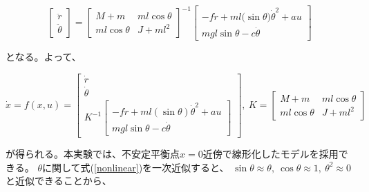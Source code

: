 \documentclass[a4j,11pt,twoside]{jbook}
\begin{document}
$$
    \left[
    \begin{array}{c}
        \ddot{r} \\
        \ddot{\theta}
    \end{array}    
    \right]
    =
    \left[
    \begin{array}{cc}
        M + m           &  ml\cos{\theta} \\
        ml\cos{\theta}  &  J + ml^2
    \end{array}
    \right]^{-1}
    \left[
        \begin{array}{c}
            -f \dot{r} + ml(\sin{\theta)} \dot{\theta}^2 + au \\
            mgl\sin{\theta} - c \dot{\theta}
        \end{array}
    \right]
$$

となる。よって、

\begin{equation}
    \dot x = f(x, u) = 
    \left[
        \begin{array}{c}
            \dot{r} \\
            \dot{\theta} \\
            K^{-1}
            \left[
                \begin{array}{c}
                    -f \dot{r} + ml(\sin{\theta}) \dot{\theta}^2 + au \\
                    mgl\sin{\theta} - c \dot{\theta}
                \end{array}
            \right]
        \end{array}    
    \right],\
    K = 
    \left[
        \begin{array}{cc}
            M + m           &  ml\cos{\theta} \\
            ml\cos{\theta}  &  J + ml^2
        \end{array}
    \right]
    \label{nonlinear}
\end{equation}

が得られる。本実験では、不安定平衡点$x=0$近傍で線形化したモデルを採用できる。
$\theta$に関して式(\ref{nonlinear})を一次近似すると、
$\sin{\theta} \approx \theta,\ \cos{\theta} \approx 1,\ \theta^2 \approx 0$と近似できることから、
\end{document}

